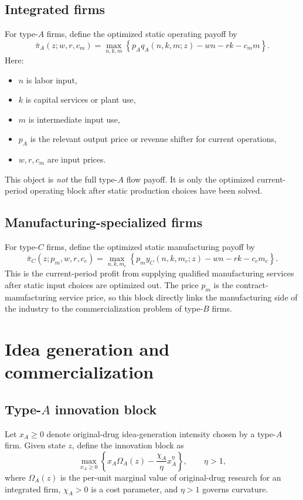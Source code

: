 \documentclass[12pt]{ctexart}
\begin{document}
\subsection{Integrated firms}

For type-$A$ firms, define the optimized static operating payoff by
\[
\bar{\pi}_A(z;w,r,c_m)
=
\max_{n,k,m}
\left\{
p_A q_A(n,k,m;z)-wn-rk-c_m m
\right\}.
\]
Here:
\begin{itemize}[leftmargin=2em]
    \item $n$ is labor input,
    \item $k$ is capital services or plant use,
    \item $m$ is intermediate input use,
    \item $p_A$ is the relevant output price or revenue shifter for current operations,
    \item $w,r,c_m$ are input prices.
\end{itemize}
This object is \emph{not} the full type-$A$ flow payoff. It is only the optimized
current-period operating block after static production choices have been solved.

\subsection{Manufacturing-specialized firms}

For type-$C$ firms, define the optimized static manufacturing payoff by
\[
\bar{\pi}_C(z;p_m,w,r,c_c)
=
\max_{n,k,m_c}
\left\{
p_m y_C(n,k,m_c;z)-wn-rk-c_c m_c
\right\}.
\]
This is the current-period profit from supplying qualified manufacturing services
after static input choices are optimized out. The price $p_m$ is the contract-manufacturing
service price, so this block directly links the manufacturing side of the industry
to the commercialization problem of type-$B$ firms.

\section{Idea generation and commercialization}

\subsection{Type-$A$ innovation block}

Let $x_A\ge 0$ denote original-drug idea-generation intensity chosen by a type-$A$ firm.
Given state $z$, define the innovation block as
\[
\max_{x_A\ge 0}
\left\{
x_A\Omega_A(z)-\frac{\chi_A}{\eta}x_A^\eta
\right\},
\qquad \eta>1,
\]
where $\Omega_A(z)$ is the per-unit marginal value of original-drug research for
an integrated firm, $\chi_A>0$ is a cost parameter, and $\eta>1$ governs curvature.
\end{document}
